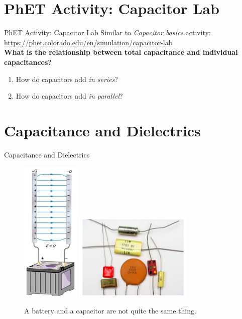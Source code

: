 \documentclass{beamer}
\begin{document}
\section{PhET Activity: Capacitor Lab}

\begin{frame}{PhET Activity: Capacitor Lab}
Similar to \textit{Capacitor basics} activity: \\ \vspace{0.5cm}
\url{https://phet.colorado.edu/en/simulation/capacitor-lab} \\ \vspace{0.5cm}
\textbf{What is the relationship between total capacitance and individual capacitances?}
\begin{enumerate}
\item How do capacitors add \textit{in series}?
\item How do capacitors add \textit{in parallel}?
\end{enumerate}
\end{frame}

\section{Capacitance and Dielectrics}

\begin{frame}{Capacitance and Dielectrics}
\begin{figure}
\centering
\includegraphics[width=0.25\textwidth]{figures/batt2.png}
\includegraphics[width=0.5\textwidth]{figures/batt3.png}
\caption{\label{fig:batt2} A battery and a capacitor are not quite the same thing.}
\end{figure}
\end{frame}
\end{document}
